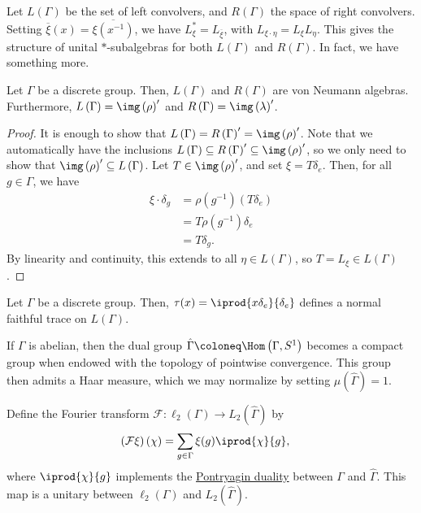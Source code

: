 \documentclass[10pt]{mypackage}
\begin{document}
Let $L\left( \Gamma \right)$ be the set of left convolvers, and $R\left( \Gamma \right)$ the space of right convolvers. Setting $ \overline{\xi}(x) = \overline{\xi\left( x^{-1} \right)} $, we have $L_{\xi}^{\ast} = L_{ \overline{\xi} }$, with $L_{\xi\cdot \eta} = L_{\xi}L_{\eta}$. This gives the structure of unital $\ast$-subalgebras for both $L\left( \Gamma \right)$ and $R\left( \Gamma \right)$. In fact, we have something more.
\begin{theorem}
  Let $\Gamma$ be a discrete group. Then, $L\left( \Gamma \right)$ and $R\left(\Gamma\right)$ are von Neumann algebras. Furthermore, $L\left( \Gamma \right) = \img\left(\rho\right)'$ and $R\left( \Gamma \right) = \img\left( \lambda \right)'$.
\end{theorem}
\begin{proof}
  It is enough to show that $L\left( \Gamma \right) = R\left( \Gamma \right)' = \img\left( \rho \right)'$. Note that we automatically have the inclusions $L\left( \Gamma \right)\subseteq R\left( \Gamma \right)'\subseteq \img\left( \rho \right)'$, so we only need to show that $\img\left( \rho \right)'\subseteq L\left( \Gamma \right)$. Let $T\in \img\left( \rho \right)'$, and set $\xi = T\delta_e$. Then, for all $g\in \Gamma$, we have
  \begin{align*}
    \xi\cdot \delta_g &= \rho\left( g^{-1} \right)\left( T\delta_e \right)\\
                      &= T\rho\left( g^{-1} \right)\delta_e\\
                      &= T\delta_g.
  \end{align*}
  By linearity and continuity, this extends to all $\eta\in L\left( \Gamma \right)$, so $T = L_{\xi}\in L\left( \Gamma \right)$.
\end{proof}
\begin{proposition}
  Let $\Gamma$ be a discrete group. Then, $\tau(x) = \iprod{x\delta_e}{\delta_e}$ defines a normal faithful trace on $L\left( \Gamma \right)$.
\end{proposition}
If $\Gamma$ is abelian, then the dual group $\hat{\Gamma}\coloneq \Hom\left( \Gamma, S^1 \right)$ becomes a compact group when endowed with the topology of pointwise convergence. This group then admits a Haar measure, which we may normalize by setting $\mu\left( \hat{\Gamma} \right) = 1$.

Define the Fourier transform $\mathcal{F}\colon \ell_2\left( \Gamma \right)\rightarrow L_2\left( \hat{\Gamma} \right)$ by
\begin{align*}
  \left( \mathcal{F}\xi \right)\left( \chi \right) &= \sum_{g\in \Gamma} \xi(g) \iprod{\chi}{g},
\end{align*}
where $ \iprod{\chi}{g} $ implements the \href{https://ncatlab.org/nlab/show/Pontrjagin+dual}{Pontryagin duality} between $\Gamma$ and $\hat{\Gamma}$. This map is a unitary between $\ell_2\left( \Gamma \right)$ and $L_2\left( \hat{\Gamma} \right)$.
\end{document}

